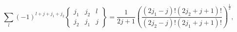 \[\sum_{l}(-1)^{l+j+j_{1}+j_{2}}\begin{Bmatrix}j_{1}&j_{2}&l\\
j_{2}&j_{1}&j\end{Bmatrix}=\frac{1}{2j+1}\left(\frac{(2j_{1}-j)!(2j_{2}+j+1)!}%
{(2j_{2}-j)!(2j_{1}+j+1)!}\right)^{\frac{1}{2}},\]